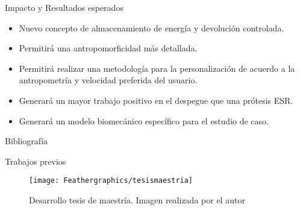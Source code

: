 \documentclass[10pt]{beamer}
\begin{document}
\begin{frame}{Impacto y Resultados esperados}
\begin{exampleblock}{}
\begin{itemize}[label={$\checkmark$}]
\item {\footnotesize{Nuevo concepto de almacenamiento de energía y devolución controlada.}}
\item {\footnotesize{Permitirá una antropomorficidad más detallada.}}
\item {\footnotesize{Permitirá realizar una metodología para la personalización de acuerdo a la antropometría y velocidad preferida del usuario.}}
\item {\footnotesize{Generará un mayor trabajo positivo en el despegue que una prótesis ESR.}}
\item {\footnotesize{Generará un modelo biomecánico específico para el estudio de caso.}}
\end{itemize}
\end{exampleblock}
\end{frame}
\begin{frame}[allowframebreaks]{Bibliografía}

\tiny{}
\end{frame}

{\BiOM
\begin{frame}
\end{frame}}
\appendix
{}
\setcounter{finalframe}{\value{framenumber}}
\begin{frame}{Trabajos previos}

\begin{figure}
\begin{centering}
\texttt{[image: Feathergraphics/tesismaestria]}
\par\end{centering}
\caption{Desarrollo tesis de maestría. Imagen realizada por el autor}

\end{figure}

\end{frame}
\end{document}
